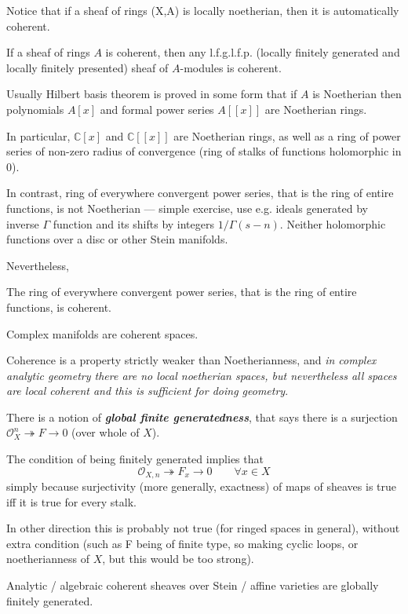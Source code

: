 \documentclass{article}
\newcommand{\C}{\mathbb{C}}
\newcommand{\Oc}{\mathcal{O}}
\begin{document}
Notice that if a sheaf of rings (X,A) is locally noetherian, then  it is automatically coherent.
\begin{prop}
	If a sheaf of rings $A$ is coherent, then any l.f.g.l.f.p. (locally finitely generated and locally finitely presented) sheaf of $A$-modules is coherent.
\end{prop}
\begin{remark}
	Usually Hilbert basis theorem is proved in some form that if $A$ is Noetherian then polynomials $A[x]$ and formal power series $A[[x]]$ are Noetherian rings.
	
	In particular, $\C[x]$ and $\C[[x]]$ are Noetherian rings, as well as a ring of power series of non-zero radius of convergence (ring of stalks of functions holomorphic in 0).
\end{remark}
\begin{exercise}
	In contrast, ring of everywhere convergent power series, that is the ring of entire functions, is not Noetherian — simple exercise, use e.g. ideals generated by inverse $\Gamma$ function and its shifts by integers $1/\Gamma(s-n)$. Neither holomorphic functions over a disc or other Stein manifolds.
\end{exercise}
Nevertheless, 
\begin{thm}
	The ring of everywhere convergent power series, that is the ring of entire functions, is coherent.
\end{thm}
\begin{coro}
	Complex manifolds are coherent spaces.
\end{coro}
Coherence is a property strictly weaker than Noetherianness, and \textit{in complex analytic geometry there are no local noetherian spaces, but nevertheless all spaces are local coherent and this is sufficient for doing geometry}.

\begin{defn}
	There is a notion of \textbf{\textit{global finite generatedness}}, that says there is a surjection $\Oc_X^n \twoheadrightarrow F \to 0$ (over whole of $X$).
\end{defn}
\begin{remark}
	The condition of being finitely generated implies that
	\[\Oc_{X,n}\twoheadrightarrow F_x\to 0\qquad\forall x\in X\]
	simply because surjectivity (more generally, exactness) of maps of sheaves is true iff it is true for every stalk.
	
	In other direction this is probably not true (for ringed spaces in general), without extra condition (such as F being of finite type, so making cyclic loops, or noetherianness of $X$, but this would be too strong).
\end{remark}
\begin{thm}
	Analytic / algebraic coherent sheaves over Stein / affine varieties are globally finitely generated.
\end{thm}
\end{document}
